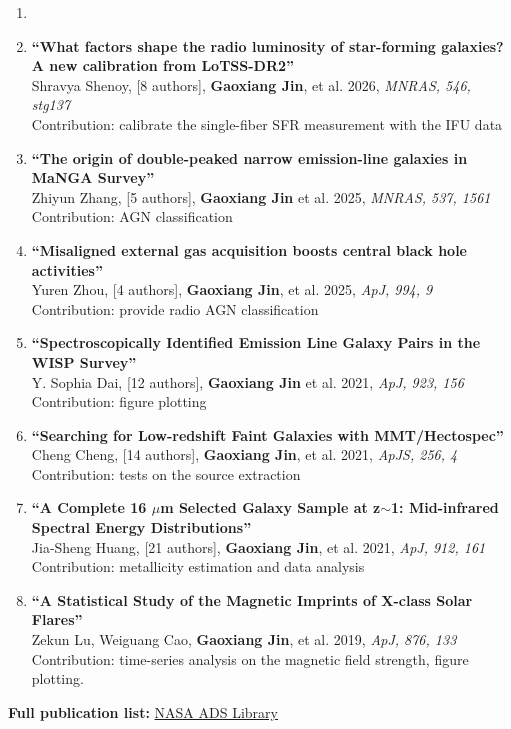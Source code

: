 \documentclass[12pt,a4paper]{article}
\begin{document}
\begin{enumerate}[leftmargin=*, itemsep=6pt]
  \item \item \textbf{``What factors shape the radio luminosity of star-forming galaxies? A new calibration from LoTSS-DR2''} \\ Shravya Shenoy, [8 authors], {\bf Gaoxiang Jin}, et al. 2026, \textit{MNRAS, 546, stg137}
  \\ Contribution: calibrate the single-fiber SFR measurement with the IFU data

  \item \textbf{``The origin of double-peaked narrow emission-line galaxies in MaNGA Survey''} \\
  Zhiyun Zhang, [5 authors], {\bf Gaoxiang Jin} et al. 2025, \textit{MNRAS, 537, 1561}
  \\ Contribution: AGN classification

  \item \textbf{``Misaligned external gas acquisition boosts central black hole activities''} \\
  Yuren Zhou, [4 authors], {\bf Gaoxiang Jin}, et al. 2025, \textit{ApJ, 994, 9}
  \\ Contribution: provide radio AGN classification

  \item \textbf{``Spectroscopically Identified Emission Line Galaxy Pairs in the WISP Survey''} \\
  Y. Sophia Dai, [12 authors], {\bf Gaoxiang Jin} et al. 2021, \textit{ApJ, 923, 156}
  \\ Contribution: figure plotting

  \item \textbf{``Searching for Low-redshift Faint Galaxies with MMT/Hectospec''} \\
  Cheng Cheng, [14 authors], \textbf{Gaoxiang Jin}, et al. 2021, \textit{ApJS, 256, 4}
  \\ Contribution: tests on the source extraction

  \item \textbf{``A Complete 16 $\mu$m Selected Galaxy Sample at z$\sim$1: Mid-infrared Spectral Energy Distributions''} \\
  Jia-Sheng Huang, [21 authors], {\bf Gaoxiang Jin}, et al. 2021, \textit{ApJ, 912, 161}
  \\ Contribution: metallicity estimation and data analysis

  \item \textbf{``A Statistical Study of the Magnetic Imprints of X-class Solar Flares''} \\
  Zekun Lu, Weiguang Cao, \textbf{Gaoxiang Jin}, et al. 2019, \textit{ApJ, 876, 133}
  \\ Contribution: time-series analysis on the magnetic field strength, figure plotting.

  
\end{enumerate}

\vspace{10pt}
\begin{center}
\colorbox{primarycolor!10}{\parbox{0.9\textwidth}{\centering
\color{primarycolor} \textbf{Full publication list:} \href{https://ui.adsabs.harvard.edu/user/libraries/SsmUZ6A8RSSVci0wvxpnww}{NASA ADS Library}
}}
\end{center}
\end{document}
